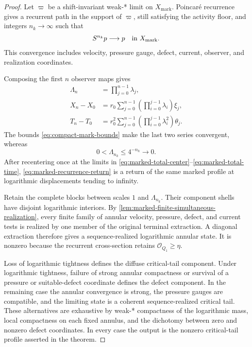 \documentclass[11pt]{amsart}
\numberwithin{equation}{section}
\theoremstyle{plain}
\theoremstyle{definition}
\theoremstyle{remark}
\begin{document}
\begin{proof}
Let \(\varpi\) be a shift-invariant weak-* limit on
\(X_{\mathrm{mark}}\).  Poincar\'e recurrence gives a recurrent path in the
support of \(\varpi\), still satisfying the activity floor, and integers
\(n_k\to\infty\) such that
\begin{equation}\label{eq:marked-recurrence-return}
 S^{n_k}p\longrightarrow p\quad\hbox{in }X_{\mathrm{mark}}.
\end{equation}
This convergence includes velocity, pressure gauge, defect, current, observer,
and realization coordinates.

Composing the first \(n\) observer maps gives
\begin{align}
 \Lambda_n&=\prod_{j=0}^{n-1}\lambda_j,
 \label{eq:marked-total-scale}\\
 X_n-X_0&=r_0\sum_{j=0}^{n-1}
   \left(\prod_{i=0}^{j-1}\lambda_i\right)\xi_j,
 \label{eq:marked-total-center}\\
 T_n-T_0&=r_0^2\sum_{j=0}^{n-1}
   \left(\prod_{i=0}^{j-1}\lambda_i^2\right)\theta_j.
 \label{eq:marked-total-time}
\end{align}
The bounds \eqref{eq:compact-mark-bounds} make the last two series convergent,
whereas
\begin{equation}\label{eq:marked-scale-collapse}
 0<\Lambda_{n_k}\le4^{-n_k}\longrightarrow0.
\end{equation}
After recentering once at the limits in
\eqref{eq:marked-total-center}--\eqref{eq:marked-total-time},
\eqref{eq:marked-recurrence-return} is a return of the same marked profile at
logarithmic displacements tending to infinity.

Retain the complete blocks between scales \(1\) and \(\Lambda_{n_k}\).
Their component shells have disjoint logarithmic interiors.  By
\cref{lem:marked-finite-simultaneous-realization}, every finite family of
annular velocity, pressure, defect, and current tests is realized by one member
of the original terminal extraction.  A diagonal extraction therefore gives a
sequence-realized logarithmic annular state.  It is nonzero because the
recurrent cross-section retains \(\mathcal O_{Q_1}\ge\eta\).

Loss of logarithmic tightness defines the diffuse critical-tail component.
Under logarithmic tightness, failure of strong annular compactness or survival
of a pressure or suitable-defect coordinate defines the defect component.  In
the remaining case the annular convergence is strong, the pressure gauges are
compatible, and the limiting state is a coherent sequence-realized critical
tail.  These alternatives are exhaustive by weak-* compactness of the
logarithmic mass, local compactness on each fixed annulus, and the dichotomy
between zero and nonzero defect coordinates.  In every case the output is the
nonzero critical-tail profile asserted in the theorem.
\end{proof}
\end{document}
